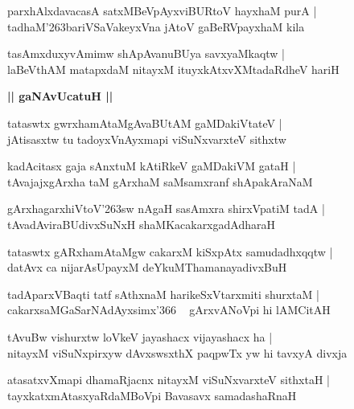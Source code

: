 \documentclass[twoside,12pt,openright]{book}
\def\S{\char'263}
\newcounter{shloka}[chapter]
\def\uvaca#1{\centerline{{\large\textbf{#1}}}}
\begin{document}
\begin{shloka}%
parxhAlxdavacasA satxMBeVpAyxviBURtoV hayxhaM purA |\\
tadhaM\S bariVSaVakeyxVna jAtoV gaBeRVpayxhaM kila
\end{shloka}

\begin{shloka}%
tasAmxduxyvAmimw shApAvanuBUya savxyaMkaqtw |\\
laBeVthAM matapxdaM nitayxM ituyxkAtxvXMtadaRdheV hariH 
\end{shloka}

\uvaca{|| gaNAvUcatuH ||}

\begin{shloka}%
tataswtx gwrxhamAtaMgAvaBUtAM gaMDakiVtateV |\\
jAtisasxtw tu tadoyxVnAyxmapi viSuNxvarxteV sithxtw 
\end{shloka}

\begin{shloka}%
kadAcitasx gaja sAnxtuM kAtiRkeV gaMDakiVM gataH |\\
tAvajajxgArxha taM gArxhaM saMsamxranf shApakAraNaM 
\end{shloka}

\begin{shloka}%
gArxhagarxhiVtoV\S sw nAgaH sasAmxra shirxVpatiM tadA |\\
tAvadAviraBUdivxSuNxH shaMKacakarxgadAdharaH 
\end{shloka}

\begin{shloka}%
tataswtx gARxhamAtaMgw cakarxM kiSxpAtx samudadhxqqtw |\\
datAvx ca nijarAsUpayxM deYkuMThamanayadivxBuH 
\end{shloka}

\begin{shloka}%
tadAparxVBaqti tatf sAthxnaM harikeSxVtarxmiti shurxtaM |\\
cakarxsaMGaSarNAdAyxsimx\char'366 ~ gArxvANoVpi hi lAMCitAH 
\end{shloka}

\begin{shloka}%
tAvuBw vishurxtw loVkeV jayashacx vijayashacx ha |\\
nitayxM viSuNxpirxyw dAvxswsxthX paqpwTx yw hi tavxyA divxja
\end{shloka}

\begin{shloka}%
atasatxvXmapi dhamaRjacnx nitayxM viSuNxvarxteV sithxtaH |\\
tayxkatxmAtasxyaRdaMBoVpi Bavasavx samadashaRnaH
\end{shloka}
\end{document}
